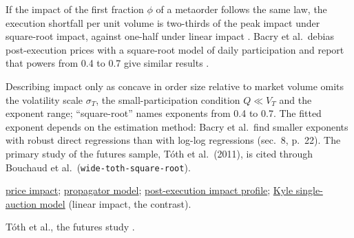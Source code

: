 \begin{qfevidence}
 If the impact of the first fraction $\phi$ of a metaorder follows the same law, the execution shortfall per unit volume is two-thirds of the peak impact under square-root impact, against one-half under linear impact \citep[same chap., sec.~12.5, eqs.~(12.10)--(12.11), p.~241]{catalogue-0528}. Bacry et al.\ debias post-execution prices with a square-root model of daily participation and report that powers from 0.4 to 0.7 give similar results \citep[arXiv preprint, sec.~7.2, n.~3, p.~21]{wide-bacry-life-cycle}.

 Describing impact only as concave in order size relative to market volume omits the volatility scale $\sigma_T$, the small-participation condition $Q\ll V_T$ and the exponent range; ``square-root'' names exponents from 0.4 to 0.7. The fitted exponent depends on the estimation method: Bacry et al.\ find smaller exponents with robust direct regressions than with log-log regressions (sec.~8, p.~22). The primary study of the futures sample, Tóth et al.\ (2011), is cited through Bouchaud et al.\ (\nolinkurl{wide-toth-square-root}).

 \hyperref[def:price-impact]{price impact}; \hyperref[mod:propagator]{propagator model}; \hyperref[meth:post-execution-impact-profile]{post-execution impact profile}; \hyperref[mod:kyle-single-auction]{Kyle single-auction model} (linear impact, the contrast).

 Tóth et al., the futures study \citep{wide-toth-square-root}.

\end{qfevidence}

